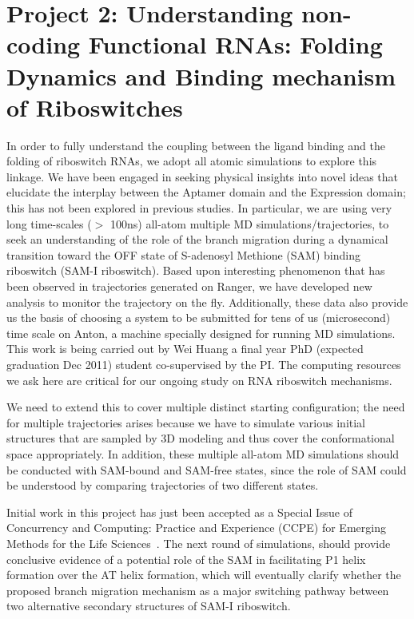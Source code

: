 \documentclass[a4paper,12pt]{article}
\date{08/07/2011}
\begin{document}
 
\section{Project 2: Understanding non-coding Functional RNAs: 
Folding Dynamics and Binding mechanism of Riboswitches}

In order to fully understand the coupling between the ligand binding
and the folding of riboswitch RNAs, we adopt all atomic simulations to
explore this linkage.  We have been engaged in seeking physical
insights into novel ideas that elucidate the interplay between the
Aptamer domain and the Expression domain; this has not been explored
in previous studies.  In particular, we are using very long
time-scales ($>$ 100ns) all-atom multiple MD simulations/trajectories,
to seek an understanding of the role of the branch migration during a
dynamical transition toward the OFF state of S-adenosyl Methione (SAM)
binding riboswitch (SAM-I riboswitch).  Based upon interesting
phenomenon that has been observed in trajectories generated on Ranger,
we have developed new analysis to monitor the trajectory on the
fly. Additionally, these data also provide us the basis of choosing a
system to be submitted for tens of us (microsecond) time scale on
Anton, a machine specially designed for running MD simulations. This
work is being carried out by Wei Huang a final year PhD (expected
graduation Dec 2011) student co-supervised by the PI.  The computing
resources we ask here are critical for our ongoing study on RNA
riboswitch mechanisms.

We need to extend this to cover multiple distinct starting
configuration; the need for multiple trajectories arises because we
have to simulate various initial structures that are sampled by 3D
modeling and thus cover the conformational space appropriately.  In
addition, these multiple all-atom MD simulations should be conducted
with SAM-bound and SAM-free states, since the role of SAM could be
understood by comparing trajectories of two different states.  

Initial work in this project has just been accepted as a Special Issue
of Concurrency and Computing: Practice and Experience (CCPE) for
Emerging Methods for the Life Sciences~\cite{ccpe10}.  The next round
of simulations, should provide conclusive evidence of a potential role
of the SAM in facilitating P1 helix formation over the AT helix
formation, which will eventually clarify whether the proposed branch
migration mechanism as a major switching pathway between two
alternative secondary structures of SAM-I riboswitch.
\end{document}
